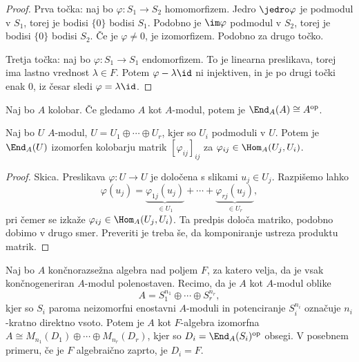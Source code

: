 \begin{proof}
  Prva točka: naj bo $\varphi: S_1 \to S_2$ homomorfizem.
  Jedro $\jedro \varphi$ je podmodul v $S_1$, torej je bodisi $\{0\}$ bodisi
  $S_1$.
  Podobno je $\im \varphi$ podmodul v $S_2$, torej je bodisi $\{0\}$ bodisi
  $S_2$.
  Če je $\varphi \ne 0$, je izomorfizem.
  Podobno za drugo točko.

  Tretja točka: naj bo $\varphi: S_1 \to S_1$ endomorfizem.
  To je linearna preslikava, torej ima lastno vrednost $\lambda \in F$.
  Potem $\varphi - \lambda \id$ ni injektiven, in je po drugi točki enak $0$, iz
  česar sledi $\varphi = \lambda \id$.
\end{proof}


\begin{lema}
  Naj bo $A$ kolobar.
  Če gledamo $A$ kot $A$-modul, potem je $\End_A(A) \cong A^{\text{op}}$.
\end{lema}

\begin{lema}
  Naj bo $U$ $A$-modul, $U = U_1 \oplus \cdots \oplus U_r$, kjer so $U_i$
  podmoduli v $U$.
  Potem je $\End_A(U)$ izomorfen kolobarju matrik $[\varphi_{ij}]_{ij}$ za
  $\varphi_{ij} \in \Hom_A(U_j, U_i)$.
\end{lema}

\begin{proof}
  Skica.
  Preslikava $\varphi: U \to U$ je določena s slikami $u_j \in U_j$.
  Razpišemo lahko
  \[
	\varphi(u_j) = \underbrace{\varphi_{1j}(u_j)}_{\in U_1} + \cdots +
	\underbrace{\varphi_{rj}(u_j)}_{\in U_r},
  \]
  pri čemer se izkaže $\varphi_{ij} \in \Hom_A(U_j, U_i)$.
  Ta predpis določa matriko, podobno dobimo v drugo smer.
  Preveriti je treba še, da komponiranje ustreza produktu matrik.
\end{proof}

\begin{izrek}
  Naj bo $A$ končnorazsežna algebra nad poljem $F$, za katero velja, da je vsak
  končnogeneriran $A$-modul polenostaven.
  Recimo, da je $A$ kot $A$-modul oblike
  \[
	A = S_1^{n_1} \oplus \cdots \oplus S_r^{n_r},
  \]
  kjer so $S_i$ paroma neizomorfni enostavni $A$-moduli in potenciranje
  $S_i^{n_i}$ označuje $n_i$-kratno direktno vsoto.
  Potem je $A$ kot $F$-algebra izomorfna $A \cong M_{n_1}(D_1) \oplus \cdots
  \oplus M_{n_r}(D_r)$, kjer so $D_i = \End_A(S_i)^{\text{op}}$ obsegi.
  V posebnem primeru, če je $F$ algebraično zaprto, je $D_i = F$.
\end{izrek}

